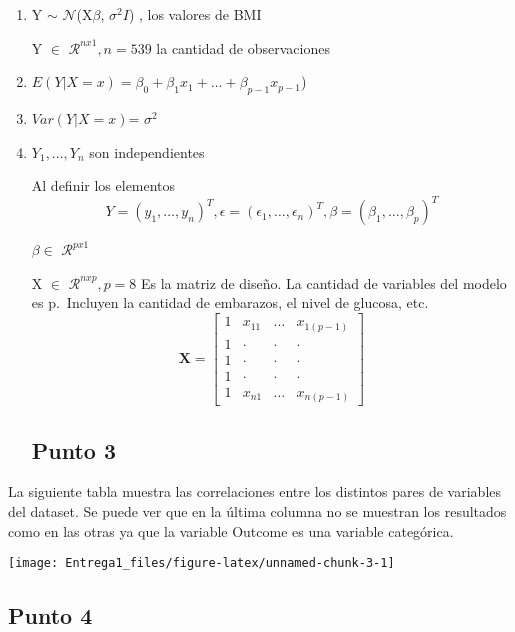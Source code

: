 \documentclass[
]{article}
\begin{document}
\begin{enumerate}
\def\labelenumi{\arabic{enumi}.}
\item
  Y \(\sim\) \(\mathcal{N}\)(X\(\beta\), \(\sigma^2I\)) , los valores de
  BMI

  Y \(\in\) \(\mathcal{R} ^{nx1}, n=539\) la cantidad de observaciones
\item
  \(E(Y|X=x)= \beta_0+\beta_1x_1+...+\beta_{p-1}x_{p-1}\))
\item
  \(Var(Y|X=x)\)= \(\sigma^2\)
\item
  \(Y_{1}, \ldots, Y_{n}\) son independientes

  Al definir los elementos\\
  \[
  Y=\left(y_{1}, \ldots, y_{n}\right)^{T}, \epsilon=\left(\epsilon_{1}, \ldots, \epsilon_{n}\right)^{T}, \beta=\left(\beta_{1}, \ldots, \beta_{p}\right)^{T}
  \]

  \(\beta\in\) \(\mathcal{R} ^{px1}\)

  X \(\in\) \(\mathcal{R} ^{nxp}, p= 8\) Es la matriz de diseño. La
  cantidad de variables del modelo es p.~Incluyen la cantidad de
  embarazos, el nivel de glucosa, etc.
  \[\mathbf{X}=\left[\begin{array}{cccc}1 & x_{11} & \ldots & x_{1(p-1)} \\1 & \cdot & \cdot & \cdot \\1 & \cdot & \cdot & \cdot \\1 & \cdot & \cdot & \cdot \\1 & x_{n 1} & \ldots & x_{n(p-1)}\end{array}\right]\]

  \hypertarget{punto-3}{%
  \subsection{Punto 3}\label{punto-3}}
\end{enumerate}

La siguiente tabla muestra las correlaciones entre los distintos pares
de variables del dataset. Se puede ver que en la última columna no se
muestran los resultados como en las otras ya que la variable Outcome es
una variable categórica.

\begin{center}\texttt{[image: Entrega1\_files/figure-latex/unnamed-chunk-3-1]} \end{center}

\hypertarget{punto-4}{%
\subsection{Punto 4}\label{punto-4}}
\end{document}
